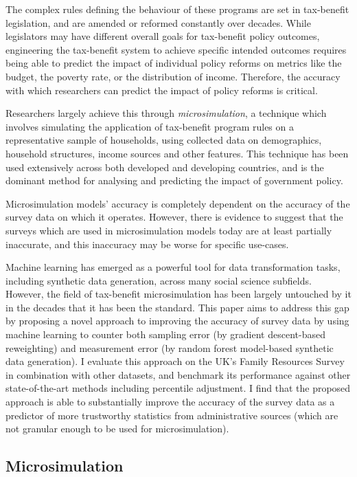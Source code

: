 \documentclass{article}
\begin{document}
The complex rules defining the behaviour of these programs are set in tax-benefit legislation, and are amended or reformed constantly over decades. While legislators may have different overall goals for tax-benefit policy outcomes, engineering the tax-benefit system to achieve specific intended outcomes requires being able to predict the impact of individual policy reforms on metrics like the budget, the poverty rate, or the distribution of income. Therefore, the accuracy with which researchers can predict the impact of policy reforms is critical.

Researchers largely achieve this through \emph{microsimulation}, a technique which involves simulating the application of tax-benefit program rules on a representative sample of households, using collected data on demographics, household structures, income sources and other features. This technique has been used extensively across both developed and developing countries, and is the dominant method for analysing and predicting the impact of government policy.

Microsimulation models' accuracy is completely dependent on the accuracy of the survey data on which it operates. However, there is evidence to suggest that the surveys which are used in microsimulation models today are at least partially inaccurate, and this inaccuracy may be worse for specific use-cases.

Machine learning has emerged as a powerful tool for data transformation tasks, including synthetic data generation, across many social science subfields. However, the field of tax-benefit microsimulation has been largely untouched by it in the decades that it has been the standard. This paper aims to address this gap by proposing a novel approach to improving the accuracy of survey data by using machine learning to counter both sampling error (by gradient descent-based reweighting) and measurement error (by random forest model-based synthetic data generation). I evaluate this approach on the UK's Family Resources Survey in combination with other datasets, and benchmark its performance against other state-of-the-art methods including percentile adjustment. I find that the proposed approach is able to substantially improve the accuracy of the survey data as a predictor of more trustworthy statistics from administrative sources (which are not granular enough to be used for microsimulation).

\subsection{Microsimulation}
\end{document}
